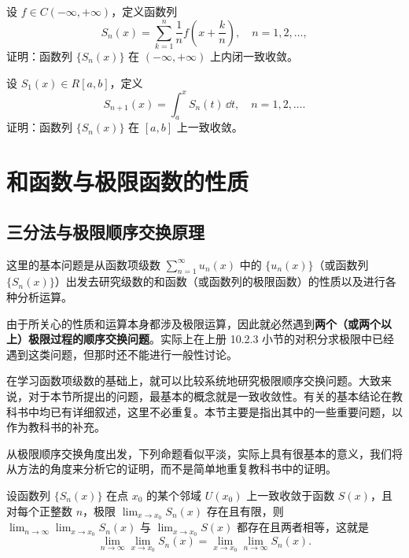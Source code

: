 \begin{xexercise}[13]
设 $f\in C(-\infty,+\infty)$，定义函数列
  \[
    S_n(x)=\sum_{k=1}^{n}\frac1n f\left(x+\frac{k}{n}\right),\quad n=1,2,\ldots,
  \]
  证明：函数列 $\{S_n(x)\}$ 在 $(-\infty,+\infty)$ 上内闭一致收敛。
\end{xexercise}

\begin{xexercise}[14]
设 $S_1(x)\in R[a,b]$，定义
  \[
    S_{n+1}(x)=\int_a^x S_n(t)\,\dd t,\quad n=1,2,\ldots.
  \]
  证明：函数列 $\{S_n(x)\}$ 在 $[a,b]$ 上一致收敛。
\end{xexercise}

\section{和函数与极限函数的性质}

\subsection{三分法与极限顺序交换原理}

这里的基本问题是从函数项级数 $\displaystyle\sum_{n=1}^{\infty}u_n(x)$ 中的 $\{u_n(x)\}$（或函数列 $\{S_n(x)\}$）出发去研究级数的和函数（或函数列的极限函数）的性质以及进行各种分析运算。

由于所关心的性质和运算本身都涉及极限运算，因此就必然遇到\textbf{两个（或两个以上）极限过程的顺序交换问题}。实际上在上册 10.2.3 小节的对积分求极限中已经遇到这类问题，但那时还不能进行一般性讨论。

在学习函数项级数的基础上，就可以比较系统地研究极限顺序交换问题。大致来说，对于本节所提出的问题，最基本的概念就是一致收敛性。有关的基本结论在教科书中均已有详细叙述，这里不必重复。本节主要是指出其中的一些重要问题，以作为教科书的补充。

从极限顺序交换角度出发，下列命题看似平淡，实际上具有很基本的意义，我们将从方法的角度来分析它的证明，而不是简单地重复教科书中的证明。

\begin{xproposition}[14.2.1]
设函数列 $\{S_n(x)\}$ 在点 $x_0$ 的某个邻域 $U(x_0)$ 上一致收敛于函数 $S(x)$，且对每个正整数 $n$，极限 $\displaystyle\lim_{x\to x_0}S_n(x)$ 存在且有限，则 $\displaystyle\lim_{n\to\infty}\lim_{x\to x_0}S_n(x)$ 与 $\displaystyle\lim_{x\to x_0}S(x)$ 都存在且两者相等，这就是
\begin{equation}
  \lim_{n\to\infty}\lim_{x\to x_0}S_n(x)=\lim_{x\to x_0}\lim_{n\to\infty}S_n(x).
  \tag{14.3}
  \label{eq:14.3}
\end{equation}
\end{xproposition}

